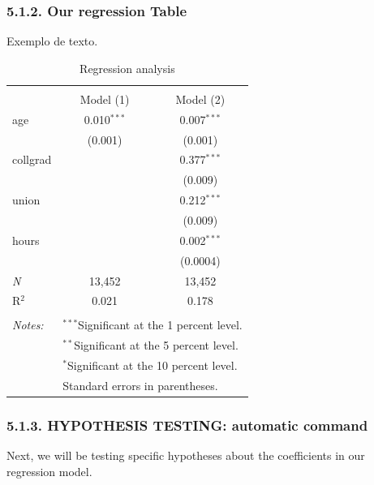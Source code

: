\documentclass[
]{article}
\begin{document}
\hypertarget{our-regression-table}{%
\subsubsection{5.1.2. Our regression Table}\label{our-regression-table}}

Exemplo de texto.

\begin{table}[!ht] \centering 
  \caption{Regression analysis} 
  \label{regressions} 
\begin{tabular}{@{\extracolsep{5pt}}lcc} 
\\[-1.8ex]\hline 
\hline \\[-1.8ex] 
 & Model (1) & Model (2) \\ 
 age & 0.010$^{***}$ & 0.007$^{***}$ \\ 
  & (0.001) & (0.001) \\ 
  collgrad &  & 0.377$^{***}$ \\ 
  &  & (0.009) \\ 
  union &  & 0.212$^{***}$ \\ 
  &  & (0.009) \\ 
  hours &  & 0.002$^{***}$ \\ 
  &  & (0.0004) \\ 
 \textit{N} & 13,452 & 13,452 \\ 
R$^{2}$ & 0.021 & 0.178 \\ 
\hline 
\hline \\[-1.8ex] 
\textit{Notes:} & \multicolumn{2}{l}{$^{***}$Significant at the 1 percent level.} \\ 
 & \multicolumn{2}{l}{$^{**}$Significant at the 5 percent level.} \\ 
 & \multicolumn{2}{l}{$^{*}$Significant at the 10 percent level.} \\ 
 & \multicolumn{2}{l}{Standard errors in parentheses.} \\ 
\end{tabular} 
\end{table}

\hypertarget{hypothesis-testing-automatic-command}{%
\subsubsection{5.1.3. HYPOTHESIS TESTING: automatic
command}\label{hypothesis-testing-automatic-command}}

Next, we will be testing specific hypotheses about the coefficients in
our regression model.
\end{document}

